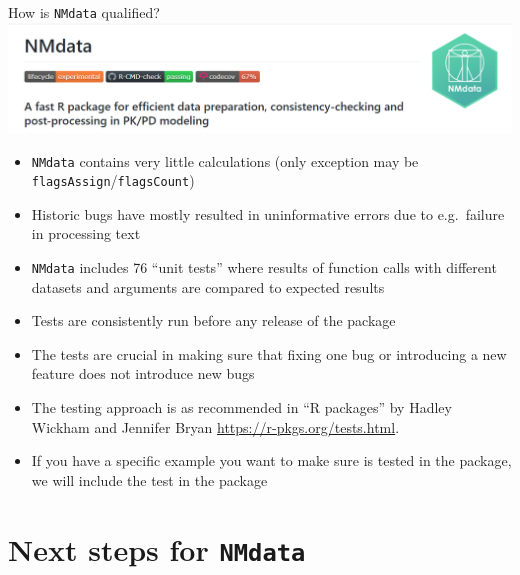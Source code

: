 \documentclass[
  8pt,
  ignorenonframetext,
  aspectratio=169]{beamer}
\begin{document}
\begin{frame}[fragile]{How is \texttt{NMdata} qualified?}
\protect\hypertarget{how-is-nmdata-qualified}{}
\includegraphics[width=.8\textwidth]{badges_snip}

\begin{itemize}
\item
  \texttt{NMdata} contains very little calculations (only exception may
  be \texttt{flagsAssign}/\texttt{flagsCount})
\item
  Historic bugs have mostly resulted in uninformative errors due to
  e.g.~failure in processing text
\item
  \texttt{NMdata} includes 76 ``unit tests'' where results of function
  calls with different datasets and arguments are compared to expected
  results
\item
  Tests are consistently run before any release of the package
\item
  The tests are crucial in making sure that fixing one bug or
  introducing a new feature does not introduce new bugs
\item
  The testing approach is as recommended in ``R packages'' by Hadley
  Wickham and Jennifer Bryan \url{https://r-pkgs.org/tests.html}.
\item
  If you have a specific example you want to make sure is tested in the
  package, we will include the test in the package
\end{itemize}
\end{frame}

\hypertarget{next-steps-for-nmdata}{%
\section{\texorpdfstring{Next steps for
\texttt{NMdata}}{Next steps for NMdata}}\label{next-steps-for-nmdata}}
\end{document}
